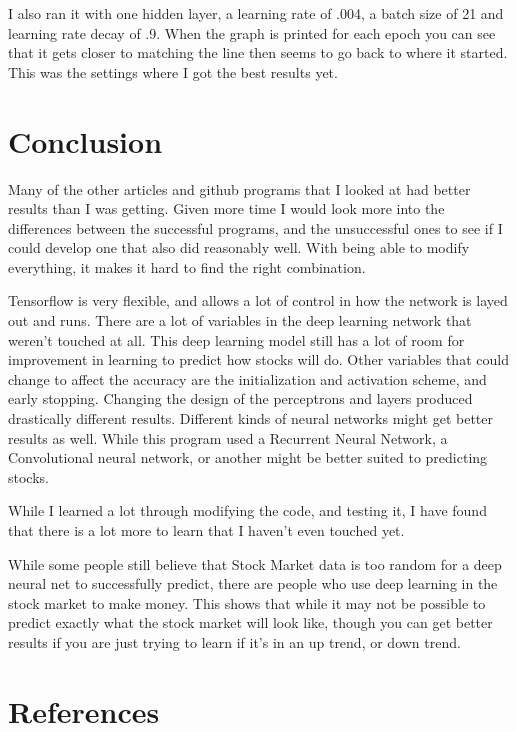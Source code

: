 \documentclass{article}
\begin{document}
I also ran it with one hidden layer, a learning rate of .004, a batch size of 21 and learning rate decay of .9.
When the graph is printed for each epoch you can see that it gets closer to matching the line then seems to go back to where it started.
This was the settings where I got the best results yet.


\section{Conclusion}

Many of the other articles and github programs that I looked at had better results than I was getting.
Given more time I would look more into the differences between the successful programs, and the unsuccessful ones to see if I could develop one that also did reasonably well. 
With being able to modify everything, it makes it hard to find the right combination.


Tensorflow is very flexible, and allows a lot of control in how the network is layed out and runs.
There are a lot of variables in the deep learning network that weren't touched at all. 
This deep learning model still has a lot of room for improvement in learning to predict how stocks will do.
Other variables that could change to affect the accuracy are the initialization and activation scheme, and early stopping.
Changing the design of the perceptrons and layers produced drastically different results. 
Different kinds of neural networks might get better results as well.
While this program used a Recurrent Neural Network, a Convolutional neural network, or another might be better suited to predicting stocks. 

While I learned a lot through modifying the code, and testing it, I have found that there is a lot more to learn that I haven't even touched yet.

While some people still believe that Stock Market data is too random for a deep neural net to successfully predict, there are people who use deep learning in the stock market to make money.
This shows that while it may not be possible to predict exactly what the stock market will look like, though you can get better results if you are just trying to learn if it's in an up trend, or down trend.


\section*{References}
\medskip

\small
\end{document}
